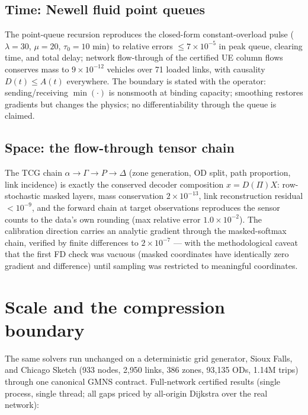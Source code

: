 \documentclass[11pt]{article}
\begin{document}
\subsection{Time: Newell fluid point queues}

The point-queue recursion reproduces the closed-form constant-overload
pulse ($\lambda{=}30$, $\mu{=}20$, $\tau_0{=}10$ min) to relative
errors $\le 7\times10^{-5}$ in peak queue, clearing time, and total
delay; network flow-through of the certified UE column flows conserves
mass to $9\times10^{-12}$ vehicles over 71 loaded links, with causality
$D(t)\le A(t)$ everywhere. The boundary is stated with the operator:
sending/receiving $\min(\cdot)$ is nonsmooth at binding capacity;
smoothing restores gradients but changes the physics; no
differentiability through the queue is claimed.

\subsection{Space: the flow-through tensor chain}

The TCG chain $\alpha \to \Gamma \to P \to \Delta$ (zone generation,
OD split, path proportion, link incidence) is exactly the conserved
decoder composition $x = D(\Pi)X$: row-stochastic masked layers, mass
conservation $2\times10^{-13}$, link reconstruction residual
$<10^{-9}$, and the forward chain at target observations reproduces the
sensor counts to the data's own rounding (max relative error
$1.0\times10^{-2}$). The calibration direction carries an analytic
gradient through the masked-softmax chain, verified by finite
differences to $2\times10^{-7}$ --- with the methodological caveat that
the first FD check was vacuous (masked coordinates have identically
zero gradient and difference) until sampling was restricted to
meaningful coordinates.

\section{Scale and the compression boundary}

The same solvers run unchanged on a deterministic grid generator, Sioux
Falls, and Chicago Sketch (933 nodes, 2{,}950 links, 386 zones,
93{,}135 ODs, 1.14M trips) through one canonical GMNS contract.
Full-network certified results (single process, single thread; all
gaps priced by all-origin Dijkstra over the real network):
\end{document}
